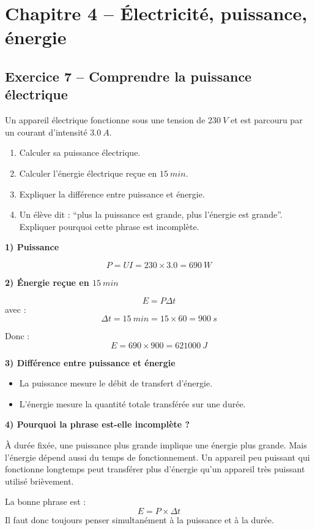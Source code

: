 \documentclass[11pt,a4paper]{article}
\begin{document}
\section{Chapitre 4 -- Électricité, puissance, énergie}

\subsection{Exercice 7 -- Comprendre la puissance électrique}

\begin{enoncebox}
Un appareil électrique fonctionne sous une tension de \(\SI{230}{V}\) et est parcouru par un courant d'intensité \(\SI{3.0}{A}\).

\begin{enumerate}[label=\arabic*)]
    \item Calculer sa puissance électrique.
    \item Calculer l'énergie électrique reçue en \(\SI{15}{min}\).
    \item Expliquer la différence entre puissance et énergie.
    \item Un élève dit : ``plus la puissance est grande, plus l'énergie est grande''. Expliquer pourquoi cette phrase est incomplète.
\end{enumerate}
\end{enoncebox}

\begin{corrigebox}
\textbf{1) Puissance}

\[
P = UI = 230 \times 3.0 = \SI{690}{W}
\]

\textbf{2) Énergie reçue en \(\SI{15}{min}\)}

\[
E = P\Delta t
\]
avec :
\[
\Delta t = \SI{15}{min} = 15\times 60 = \SI{900}{s}
\]

Donc :
\[
E = 690 \times 900 = \SI{621000}{J}
\]

\textbf{3) Différence entre puissance et énergie}

\begin{itemize}
    \item La puissance mesure le débit de transfert d'énergie.
    \item L'énergie mesure la quantité totale transférée sur une durée.
\end{itemize}

\textbf{4) Pourquoi la phrase est-elle incomplète ?}

À durée fixée, une puissance plus grande implique une énergie plus grande.  
Mais l'énergie dépend aussi du temps de fonctionnement.  
Un appareil peu puissant qui fonctionne longtemps peut transférer plus d'énergie qu'un appareil très puissant utilisé brièvement.

\begin{methodebox}
La bonne phrase est :
\[
E = P\times \Delta t
\]
Il faut donc toujours penser simultanément à la puissance et à la durée.
\end{methodebox}
\end{corrigebox}
\end{document}
